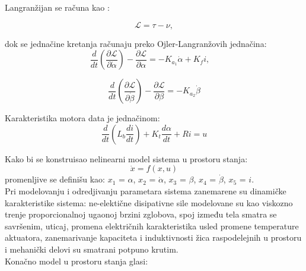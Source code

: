 \documentclass[a4paper,11pt]{article}
\theoremstyle{definition} \newtheorem{deff}{Definicija}[section]
\theoremstyle{definition} \newtheorem{prim}[deff]{Primer}
\theoremstyle{plain} \newtheorem{teor}[deff]{Teorema}
\begin{document}
	Langranžijan se računa kao :
	
	\begin{equation}
		\mathcal{L} = \tau - \nu, 
	\end{equation}
	
	dok se jednačine kretanja računaju preko Ojler-Langranžovih jednačina: 
	\begin{equation}
		\frac{d}{dt} \left(\frac{\partial \mathcal{L}}{\partial \dot\alpha}\right) - \frac{\partial \mathcal{L}}{\partial \alpha} = -K_{a_1} \dot\alpha + K_f i, \quad 
	\end{equation}
	
	\begin{equation}
		\frac{d}{dt} \left( \frac{\partial \mathcal{L}}{\partial \dot\beta} \right) - \frac{\partial \mathcal{L}}{\partial \beta} = -K_{a_2} \dot\beta
	\end{equation}
	
	Karakteristika motora data je jednačinom: 
	\begin{equation}
		\frac{d}{dt} \left( L_b \frac{di}{dt} \right) + K_t \frac{d\alpha}{dt} + R i = u
	\end{equation}
	
	Kako bi se konstruisao nelinearni model sistema u prostoru stanja: 
	\begin{equation}
		\dot x = f(x, u)
	\end{equation}
	promenljive se definišu kao: $x_1$ = $\alpha$, $x_2$ = $\dot\alpha$,  $x_3$ = $\beta$, $x_4$ = $\dot\beta$, $x_5$ = $i$. \\
	
	
	Pri modelovanju i odredjivanju parametara sistema
	zanemarene su dinamičke karakteristike sistema: ne-elektične disipativne sile modelovane su kao viskozno trenje proporcionalnoj ugaonoj brzini zglobova, spoj između tela smatra se savršenim, uticaj, promena električnih karakteristika usled promene temperature aktuatora, zanemarivanje kapaciteta i induktivnosti žica raspodelejnih u prostoru i mehanički delovi su smatrani potpuno krutim.\\
	
	
	Konačno model u prostoru stanja glasi:
	
\end{document}
